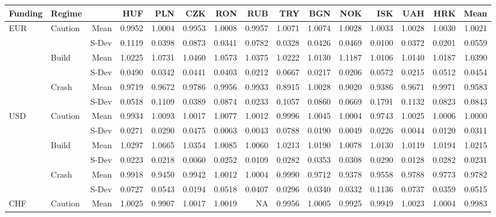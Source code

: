 \documentclass[12pt, a4paper, oneside]{article} %
\begin{document}
\begin{landscape}
\begin{table}[ht]
\centering
\begin{tabular}{llrrrrrrrrrrrrr}
  \hline
 Funding&Regime& & HUF & PLN & CZK & RON & RUB & TRY & BGN & NOK & ISK & UAH & HRK & Mean\\ 
 \hline
  \hline
\multirow{6}{*}{EUR}&\multirow{2}{*}{Caution}&Mean & 0.9952 & 1.0004 & 0.9953 & 1.0008 & 0.9957 & 1.0071 & 1.0074 & 1.0028 & 1.0033 & 1.0028 & 1.0030 & 1.0021\\ 
  &&S-Dev & 0.1119 & 0.0398 & 0.0873 & 0.0341 & 0.0782 & 0.0328 & 0.0426 & 0.0469 & 0.0100 & 0.0372 & 0.0201 & 0.0559\\ 
  & \multirow{2}{*}{Build} & Mean & 1.0225 & 1.0731 & 1.0460 & 1.0573 & 1.0375 & 1.0222 & 1.0130 & 1.1187 & 1.0106 & 1.0140 & 1.0187 &1.0390 \\
  && S-Dev & 0.0490 & 0.0342 & 0.0441 & 0.0403 & 0.0212 & 0.0667 & 0.0217 & 0.0206 & 0.0572 & 0.0215 & 0.0512 & 0.0454\\ 
  & \multirow{2}{*}{Crash} & Mean & 0.9719 & 0.9672 & 0.9786 & 0.9956 & 0.9933 & 0.8915 & 1.0028 & 0.9020 & 0.9386 & 0.9671 & 0.9971 & 0.9583\\ 
  && S-Dev & 0.0518 & 0.1109 & 0.0389 & 0.0874 & 0.0233 & 0.1057 & 0.0860 & 0.0669 & 0.1791 & 0.1132 & 0.0823 & 0.0843\\ 
\hline
\multirow{6}{*}{USD}& \multirow{2}{*}{Caution} & Mean   & 0.9934 & 1.0093 & 1.0017 & 1.0077 & 1.0012 & 0.9996 & 1.0045 & 1.0004 & 0.9743 & 1.0025 & 1.0006 & 1.0000\\ 
  && S-Dev & 0.0271 & 0.0290 & 0.0475 & 0.0063 & 0.0043 & 0.0788 & 0.0190 & 0.0049 & 0.0226 & 0.0044 & 0.0120 & 0.0311\\ 
  & \multirow{2}{*}{Build} & Mean & 1.0297 & 1.0665 & 1.0354 & 1.0085 & 1.0060 & 1.0213 & 1.0190 & 1.0078 & 1.0130 & 1.0119 & 1.0194 & 1.0215\\ 
  && S-Dev & 0.0223 & 0.0218 & 0.0060 & 0.0252 & 0.0109 & 0.0282 & 0.0353 & 0.0308 & 0.0290 & 0.0128 & 0.0282 & 0.0231 \\ 
  & \multirow{2}{*}{Crash} & Mean & 0.9918 & 0.9450 & 0.9942 & 1.0012 & 1.0004 & 0.9990 & 0.9712 & 0.9378 & 0.9558 & 0.9788 & 0.9773 & 0.9782\\ 
  && S-Dev & 0.0727 & 0.0543 & 0.0194 & 0.0518 & 0.0407 & 0.0296 & 0.0340 & 0.0332 & 0.1136 & 0.0737 & 0.0359 & 0.0515\\ 
\hline
\multirow{6}{*}{CHF}& \multirow{2}{*}{Caution} & Mean& 1.0025 & 0.9907 & 1.0017 & 1.0019 & NA & 0.9956 & 1.0005 & 0.9925 & 0.9949 & 1.0023 & 1.0004 & 0.9983\\ 

\end{tabular}
\end{table}
\end{landscape}
\end{document}
